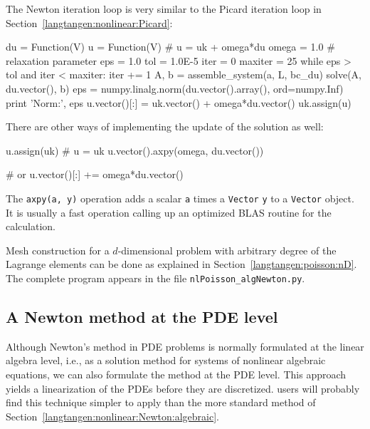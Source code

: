 The Newton iteration loop is very similar to the Picard iteration loop
in Section~\ref{langtangen:nonlinear:Picard}:
\begin{python}
du = Function(V)
u  = Function(V)  # u = uk + omega*du
omega = 1.0       # relaxation parameter
eps = 1.0
tol = 1.0E-5
iter = 0
maxiter = 25
while eps > tol and iter < maxiter:
    iter += 1
    A, b = assemble_system(a, L, bc_du)
    solve(A, du.vector(), b)
    eps = numpy.linalg.norm(du.vector().array(), ord=numpy.Inf)
    print 'Norm:', eps
    u.vector()[:] = uk.vector() + omega*du.vector()
    uk.assign(u)
\end{python}
There are other ways of implementing the
update of the solution as well:
\begin{python}
u.assign(uk)  # u = uk
u.vector().axpy(omega, du.vector())

# or
u.vector()[:] += omega*du.vector()
\end{python}
The {\fontsize{10pt}{10pt}\texttt{axpy(a, y)}} operation adds a scalar {\fontsize{10pt}{10pt}\texttt{a}} times a {\fontsize{10pt}{10pt}\texttt{Vector}}
{\fontsize{10pt}{10pt}\texttt{y}} to a {\fontsize{10pt}{10pt}\texttt{Vector}} object.  It is usually a fast operation
calling up an optimized BLAS routine for the calculation.

Mesh construction for a $d$-dimensional problem with arbitrary degree of
the Lagrange elements can be done as
explained in Section~\ref{langtangen:poisson:nD}. 
The complete program appears in the file {\fontsize{10pt}{10pt}\verb!nlPoisson_algNewton.py!}.


\subsection{A Newton method at the PDE level}
\label{langtangen:nonlinear:Newton:pdelevel}
\label{Newton's method}

Although Newton's method in PDE problems is normally formulated at the
linear algebra level, i.e., as a solution method for systems of nonlinear
algebraic equations, we can also formulate the method at the PDE level.
This approach yields a linearization of the PDEs before they are discretized.
\fenics{} users will probably find this technique simpler to apply than
the more standard method of Section~\ref{langtangen:nonlinear:Newton:algebraic}.

